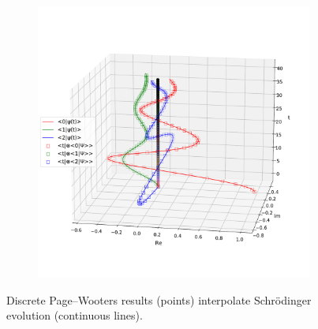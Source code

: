 \begin{figure}[p] %
  \begin{leftfullpage}
    \begin{subfigure}{\textwidth}
      \includegraphics[width=\textwidth]{img/3ldetect/PWSpaceTimeFit_side.pdf}
      \label{fig:3lev:PWSpaceTimeFit:side}
    \end{subfigure}
    \caption{
      Discrete Page--Wooters results (points)
      interpolate
      Schr\"{o}dinger
      evolution (continuous lines).
    }
    \label{fig:3lev:PWSpaceTimeFit}
  \end{leftfullpage}
\end{figure}
